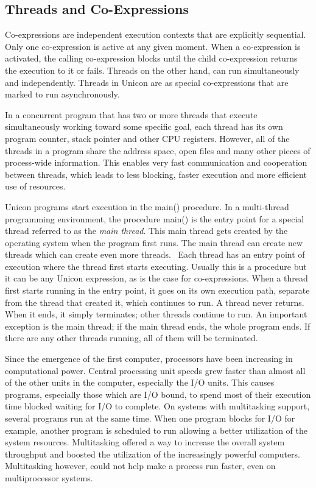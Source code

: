 \subsection[Threads and Co{}-Expressions ]{Threads and Co-Expressions}

Co-expressions are independent execution contexts that are explicitly
sequential. Only one co-expression is active at any given moment. When
a co-expression is activated, the calling co-expression blocks until
the child co-expression returns the execution to it or fails. Threads
on the other hand, can run simultaneously and independently. Threads
in Unicon are as special co-expressions that are marked to run
asynchronously.

In a concurrent
program that has two or more threads that execute simultaneously
working toward some specific goal, each thread has its own program
counter, stack pointer and other CPU registers. However, all of the
threads in a program share the address space, open files and many other
pieces of process-wide information. This enables very fast
communication and cooperation between threads, which leads to less
blocking, faster execution and more efficient use of resources. 

Unicon programs start execution in the {\textsf main()} procedure. In a
multi-thread programming environment, the procedure {\textsf main()} is
the entry point for a special thread referred to as the
{\em main thread}. This main thread
gets created by the operating system when the program first runs. The
main thread can create new threads which can create even more threads.
\ Each thread has an entry point of execution where the thread first
starts executing. Usually this is a procedure but it can be any Unicon
expression, as is the case for co-expressions. When a thread first
starts running in the entry point, it goes on its own execution path,
separate from the thread that created it, which continues to run. A
thread never returns. When it ends, it simply terminates; other threads
continue to run. An important exception is the main thread; if the main
thread ends, the whole program ends. If there are any other threads
running, all of them will be terminated. 



Since the emergence of the first computer, processors have been
increasing in computational power. Central processing unit speeds grew
faster than almost all of the other units in the computer, especially
the I/O units. This causes programs, especially those which are I/O
bound, to spend most of their execution time blocked waiting for I/O to
complete. On systems with multitasking support, several programs run
at the same time. When one program blocks for I/O for example, another
program is scheduled to run allowing a better utilization of the system
resources. Multitasking offered a way to increase the overall system
throughput and boosted the utilization of the increasingly powerful
computers. Multitasking however, could not help make a process run
faster, even on multiprocessor systems.

